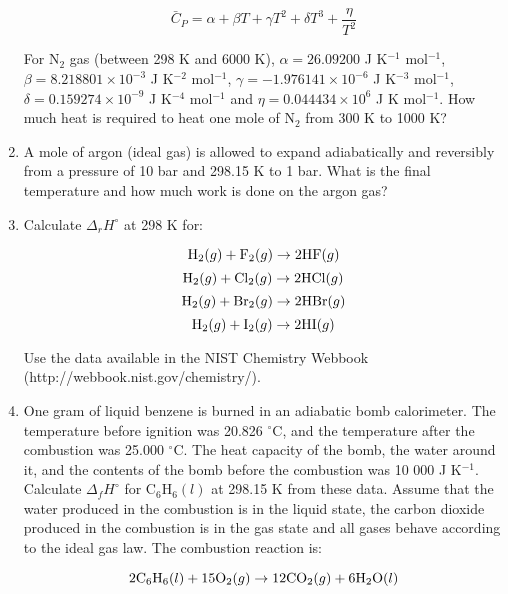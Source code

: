 \begin{enumerate}
$$\bar{C}_P = \alpha + \beta T + \gamma T^2 + \delta T^3 + \frac{\eta}{T^2}$$

For N$_2$ gas (between 298 K and 6000 K), $\alpha = 26.09200$ J K$^{-1}$ mol$^{-1}$, $\beta = 8.218801\times 10^{-3}$ J K$^{-2}$ mol$^{-1}$, $\gamma = -1.976141\times 10^{-6}$ J K$^{-3}$ mol$^{-1}$, $\delta = 0.159274\times 10^{-9}$ J K$^{-4}$ mol$^{-1}$ and $\eta = 0.044434\times 10^{6}$ J K mol$^{-1}$. How much heat is required to heat one mole of N$_2$ from 300 K to 1000 K?


\item A mole of argon (ideal gas) is allowed to expand adiabatically and reversibly from a pressure of 10 bar and 298.15 K to 1 bar. What is the final temperature and how much work is done on the argon gas?


\item Calculate $\Delta_rH^\circ$ at 298 K for:

$$\textnormal{H}_2(g) + \textnormal{F}_2(g) \rightarrow 2\textnormal{HF}(g)$$
$$\textnormal{H}_2(g) + \textnormal{Cl}_2(g) \rightarrow 2\textnormal{HCl}(g)$$
$$\textnormal{H}_2(g) + \textnormal{Br}_2(g) \rightarrow 2\textnormal{HBr}(g)$$
$$\textnormal{H}_2(g) + \textnormal{I}_2(g) \rightarrow 2\textnormal{HI}(g)$$

Use the data available in the NIST Chemistry Webbook\\
(http://webbook.nist.gov/chemistry/).


\item One gram of liquid benzene is burned in an adiabatic bomb calorimeter. The temperature before ignition was 20.826 $^\circ$C, and the temperature after the combustion was 25.000 $^\circ$C. The heat capacity of the bomb, the water around it, and the contents of the bomb before the combustion was 10 000 J K$^{-1}$. Calculate $\Delta_fH^\circ$ for C$_6$H$_6(l)$ at 298.15 K from these data. Assume that the water produced in the combustion is in the liquid state, the carbon dioxide produced in the combustion is in the gas state and all gases
behave according to the ideal gas law. The combustion reaction is:

$$2\textnormal{C}_6\textnormal{H}_6(l) + 15\textnormal{O}_2(g) \rightarrow 12\textnormal{CO}_2(g) + 6\textnormal{H}_2\textnormal{O}(l)$$


\end{enumerate}
